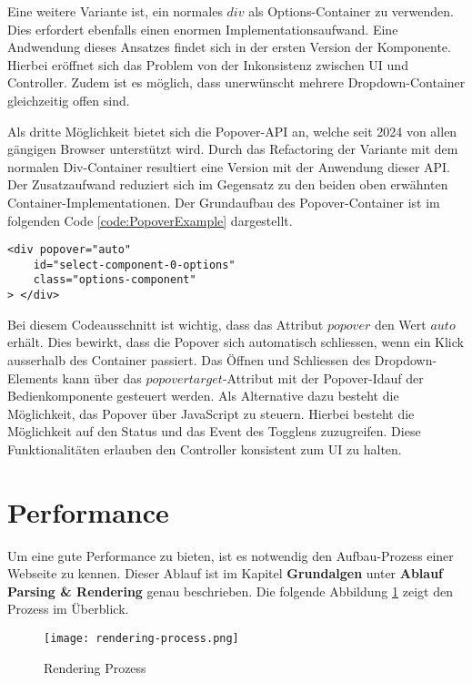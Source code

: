 Eine weitere Variante ist, ein normales $div$ als Options-Container zu verwenden.
Dies erfordert ebenfalls einen enormen Implementationsaufwand.
Eine Andwendung dieses Ansatzes findet sich in der ersten Version der Komponente.
Hierbei eröffnet sich das Problem von der Inkonsistenz zwischen UI und Controller.
Zudem ist es möglich, dass unerwünscht mehrere Dropdown-Container gleichzeitig offen sind.

Als dritte Möglichkeit bietet sich die Popover-API an, welche seit 2024 von allen gängigen Browser unterstützt wird.
Durch das Refactoring der Variante mit dem normalen Div-Container resultiert eine Version mit der Anwendung dieser API.
Der Zusatzaufwand reduziert sich im Gegensatz zu den beiden oben erwähnten Container-Implementationen.
Der Grundaufbau des Popover-Container ist im folgenden Code \ref{code:PopoverExample} dargestellt.

\begin{lstlisting}[style = htmlcssjs, caption = Popover-Container Beispiel, label = code:PopoverExample]
<div popover="auto"
    id="select-component-0-options" 
    class="options-component" 
> </div>
\end{lstlisting}

Bei diesem Codeausschnitt ist wichtig, dass das Attribut $popover$ den Wert $auto$ erhält.
Dies bewirkt, dass die Popover sich automatisch schliessen, wenn ein Klick ausserhalb des Container passiert.
Das Öffnen und Schliessen des Dropdown-Elements kann über das $popovertarget$-Attribut mit der Popover-Id\footnotemark auf der Bedienkomponente gesteuert werden.
Als Alternative dazu besteht die Möglichkeit, das Popover über JavaScript zu steuern.
Hierbei besteht die Möglichkeit auf den Status und das Event des Togglens zuzugreifen.
Diese Funktionalitäten erlauben den Controller konsistent zum UI zu halten.


\section{Performance}
\label{sec:performance}

Um eine gute Performance zu bieten, ist es notwendig den Aufbau-Prozess einer Webseite zu kennen.
Dieser Ablauf ist im Kapitel \textbf{Grundalgen} unter \textbf{Ablauf Parsing \& Rendering} genau beschrieben.
Die folgende Abbildung \ref{img:RenderingProcessRecap} zeigt den Prozess im Überblick.

\begin{figure}[!htb]
    \centering
    \texttt{[image: rendering-process.png]}
    \caption{Rendering Prozess}
    \label{img:RenderingProcessRecap}
\end{figure}

